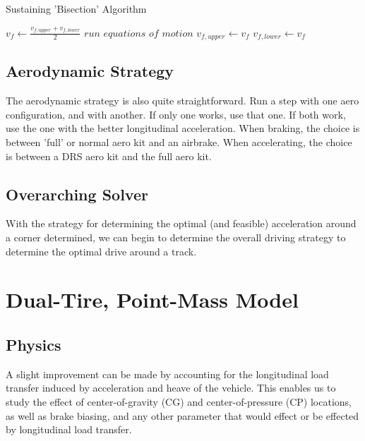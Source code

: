 \documentclass{article}
\begin{document}
\begin{algorithm}[H]
\caption{Sustaining 'Bisection' Algorithm}
\begin{algorithmic}[1]
		\State $v_f \gets \frac{v_{f,upper}+v_{f,lower}}{2}$
		\State $run$ $equations$ $of$ $motion$
			\State $v_{f,upper} \gets v_{f}$
		\Else
			\State $v_{f,lower} \gets v_{f}$
		\EndIf
	\EndWhile
\end{algorithmic}
\end{algorithm}

\subsection{Aerodynamic Strategy}

The aerodynamic strategy is also quite straightforward. Run a step with one aero configuration, and with another. If only one works, use that one. If both work, use the one with the better longitudinal acceleration. When braking, the choice is between 'full' or normal aero kit and an airbrake. When accelerating, the choice is between a DRS aero kit and the full aero kit.

\subsection{Overarching Solver}

With the strategy for determining the optimal (and feasible) acceleration around a corner determined, we can begin to determine the overall driving strategy to determine the optimal drive around a track.

\section{Dual-Tire, Point-Mass Model}

\subsection{Physics}

A slight improvement can be made by accounting for the longitudinal load transfer induced by acceleration and heave of the vehicle. This enables us to study the effect of center-of-gravity (CG) and center-of-pressure (CP) locations, as well as brake biasing, and any other parameter that would effect or be effected by longitudinal load transfer.
\end{document}
